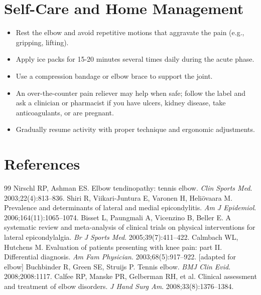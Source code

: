 \section*{Self-Care and Home Management}
\begin{itemize}
  \item Rest the elbow and avoid repetitive motions that aggravate the pain (e.g., gripping, lifting).
  \item Apply ice packs for 15-20 minutes several times daily during the acute phase.
  \item Use a compression bandage or elbow brace to support the joint.
  \item An over-the-counter pain reliever may help when safe; follow the label and ask a clinician or pharmacist if you have ulcers, kidney disease, take anticoagulants, or are pregnant.
  \item Gradually resume activity with proper technique and ergonomic adjustments.
\end{itemize}

\section*{References}
\begin{thebibliography}{99}
Nirschl RP, Ashman ES. Elbow tendinopathy: tennis elbow. \textit{Clin Sports Med}. 2003;22(4):813--836.
Shiri R, Viikari-Juntura E, Varonen H, Heli\"{o}vaara M. Prevalence and determinants of lateral and medial epicondylitis. \textit{Am J Epidemiol}. 2006;164(11):1065--1074.
Bisset L, Paungmali A, Vicenzino B, Beller E. A systematic review and meta-analysis of clinical trials on physical interventions for lateral epicondylalgia. \textit{Br J Sports Med}. 2005;39(7):411--422.
Calmbach WL, Hutchens M. Evaluation of patients presenting with knee pain: part II. Differential diagnosis. \textit{Am Fam Physician}. 2003;68(5):917--922. [adapted for elbow]
Buchbinder R, Green SE, Struijs P. Tennis elbow. \textit{BMJ Clin Evid}. 2008;2008:1117.
Calfee RP, Manske PR, Gelberman RH, et al. Clinical assessment and treatment of elbow disorders. \textit{J Hand Surg Am}. 2008;33(8):1376--1384.
\end{thebibliography}
